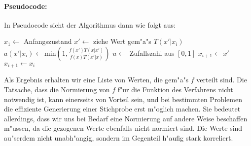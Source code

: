 	
	
	\paragraph{Pseudocode:}
	In Pseudocode sieht der Algorithmus dann wie folgt aus:
	\begin{algorithmic}
		\STATE $x_1 \leftarrow$ Anfangszustand
			\STATE $x'\leftarrow$ ziehe Wert gem"a"s $T(x'|x_i)$
			\STATE $a(x'|x_i) \leftarrow \text{min}\left(1, \frac{f(x')T(x|x')}{f(x)T(x'|x)}\right)$
			\STATE $u\leftarrow$ Zufallszahl aus $[0,1]$
				\STATE $x_{i+1} \leftarrow x'$
			\ELSE	\STATE $x_{i+1} \leftarrow x_i$
			\ENDIF
	  \ENDFOR
	\end{algorithmic}
	Als Ergebnis erhalten wir eine Liste von Werten, die gem"a"s $f$ verteilt sind.
	Die Tatsache, dass die Normierung von $f$ f"ur die Funktion des Verfahrens nicht notwendig ist, kann einerseits von Vorteil sein, und bei bestimmten Problemen die effiziente Generierung einer Stichprobe erst m"oglich machen. Sie bedeutet allerdings, dass wir uns bei Bedarf eine Normierung auf andere Weise beschaffen m"ussen, da die gezogenen Werte ebenfalls nicht normiert sind. Die Werte sind au"serdem nicht unabh"angig, sondern im Gegenteil h"aufig stark korreliert.


